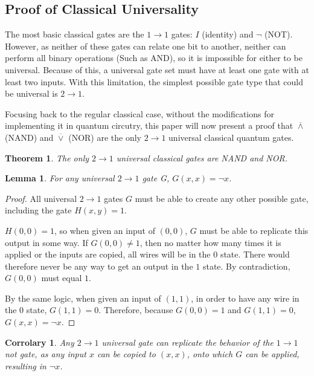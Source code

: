 \documentclass[12pt]{article}
\newcommand{\nand}{\overline{\land}}
\newcommand{\nor}{\overline{\lor}}
\begin{document}
\subsection{Proof of Classical Universality}
The most basic classical gates are the $1 \to 1$ gates: $I$ (identity) and $\neg$ (NOT). However, as neither of these gates can relate one bit to another, neither can perform all binary operations (Such as AND), so it is impossible for either to be universal. Because of this, a universal gate set must have at least one gate with at least two inputs.
With this limitation, the simplest possible gate type that could be universal is $2 \to 1$.

Focusing back to the regular classical case, without the modifications for implementing it in quantum circutry, this paper will now present a proof that $\nand$ (NAND) and $\nor$ (NOR) are the only $2 \to 1$ universal classical quantum gates.


\newtheorem{theorem}{Theorem}
\newtheorem{lemma}{Lemma}
\newtheorem{corrolary}{Corrolary}

\begin{theorem}
    The only $2 \to 1$ universal classical gates are NAND and NOR.
\end{theorem}

\begin{lemma}
    For any universal $2 \to 1$ gate G, $G(x, x) = \neg x$.
\end{lemma}

\begin{proof}
    All universal $2 \to 1$ gates $G$ must be able to create any other possible gate, including the gate $H(x, y) = 1$.

    $H(0, 0) = 1$, so when given an input of $(0, 0)$, $G$ must be able to replicate this output in some way. If $G(0, 0) \ne 1$, then no matter how many times it is applied or the inputs are copied, all wires will be in the $0$ state. There would therefore never be any way to get an output in the $1$ state. By contradiction, $G(0, 0)$ must equal $1$.
    
    By the same logic, when given an input of $(1, 1)$, in order to have any wire in the $0$ state, $G(1, 1) = 0$.
    Therefore, because $G(0, 0) = 1$ and $G(1, 1) = 0$, $G(x, x) = \neg x$. 
\end{proof}

\begin{corrolary}
    Any $2 \to 1$ universal gate can replicate the behavior of the $1 \to 1$ not gate, as any input $x$ can be copied to $(x, x)$, onto which $G$ can be applied, resulting in $\neg x$.
\end{corrolary}
\end{document}
